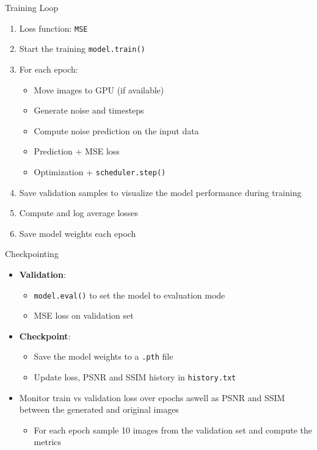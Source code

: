 \begin{frame}{Training Loop}
    \begin{enumerate}
        \item Loss function: \texttt{MSE}
        \item Start the training \texttt{model.train()}
        \item For each epoch:
              \begin{itemize}
                  \item Move images to GPU (if available)
                  \item Generate noise and timesteps
                  \item Compute noise prediction on the input data
                  \item Prediction + MSE loss
                  \item Optimization + \texttt{scheduler.step()}
              \end{itemize}
        \item Save validation samples to visualize the model performance during training
        \item Compute and log average losses
        \item Save model weights each epoch
    \end{enumerate}
\end{frame}

\begin{frame}{Checkpointing}
    \begin{itemize}
        \item \textbf{Validation}:
              \begin{itemize}
                  \item \texttt{model.eval()} to set the model to evaluation mode
                  \item MSE loss on validation set
              \end{itemize}
        \item \textbf{Checkpoint}:
              \begin{itemize}
                  \item Save the model weights to a \texttt{.pth} file
                  \item Update loss, PSNR and SSIM history in \texttt{history.txt}
              \end{itemize}
        \item Monitor train vs validation loss over epochs aswell as PSNR and SSIM between the generated and original images
              \begin{itemize}
                  \item For each epoch sample 10 images from the validation set and compute the metrics
              \end{itemize}
    \end{itemize}
\end{frame}

